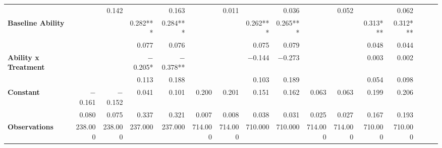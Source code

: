 \begin{tabular}{@{\extracolsep{5pt}}lrrrrrrrrrrrrrrr}
{\bf } & \phantom{***} & 0.142\phantom{\phantom{)}***} & \phantom{***} & 0.163\phantom{\phantom{)}***} & \phantom{***} & 0.011\phantom{\phantom{)}***} & \phantom{***} & 0.036\phantom{\phantom{)}***} & \phantom{***} & 0.052\phantom{\phantom{)}***} & \phantom{***} & 0.062\phantom{\phantom{)}***} \\
{\bf Baseline Ability} & \phantom{***} & \phantom{***} & 0.282\phantom{)}*** & 0.284\phantom{)}*** & \phantom{***} & \phantom{***} & 0.262\phantom{)}*** & 0.265\phantom{)}*** & \phantom{***} & \phantom{***} & 0.313\phantom{)}*** & 0.312\phantom{)}*** \\
{\bf } & \phantom{***} & \phantom{***} & 0.077\phantom{\phantom{)}***} & 0.076\phantom{\phantom{)}***} & \phantom{***} & \phantom{***} & 0.075\phantom{\phantom{)}***} & 0.079\phantom{\phantom{)}***} & \phantom{***} & \phantom{***} & 0.048\phantom{\phantom{)}***} & 0.044\phantom{\phantom{)}***} \\
{\bf Ability x Treatment} & \phantom{***} & \phantom{***} & $-$0.205\phantom{)}*\phantom{**} & $-$0.378\phantom{)}**\phantom{*} & \phantom{***} & \phantom{***} & $-$0.144\phantom{\phantom{)}***} & $-$0.273\phantom{\phantom{)}***} & \phantom{***} & \phantom{***} & 0.003\phantom{\phantom{)}***} & 0.002\phantom{\phantom{)}***} \\
{\bf } & \phantom{***} & \phantom{***} & 0.113\phantom{\phantom{)}***} & 0.188\phantom{\phantom{)}***} & \phantom{***} & \phantom{***} & 0.103\phantom{\phantom{)}***} & 0.189\phantom{\phantom{)}***} & \phantom{***} & \phantom{***} & 0.054\phantom{\phantom{)}***} & 0.098\phantom{\phantom{)}***} \\
{\bf Constant} & $-$0.161\phantom{\phantom{)}***} & $-$0.152\phantom{\phantom{)}***} & 0.041\phantom{\phantom{)}***} & 0.101\phantom{\phantom{)}***} & 0.200\phantom{\phantom{)}***} & 0.201\phantom{\phantom{)}***} & 0.151\phantom{\phantom{)}***} & 0.162\phantom{\phantom{)}***} & 0.063\phantom{\phantom{)}***} & 0.063\phantom{\phantom{)}***} & 0.199\phantom{\phantom{)}***} & 0.206\phantom{\phantom{)}***} \\
{\bf } & 0.080\phantom{\phantom{)}***} & 0.075\phantom{\phantom{)}***} & 0.337\phantom{\phantom{)}***} & 0.321\phantom{\phantom{)}***} & 0.007\phantom{\phantom{)}***} & 0.008\phantom{\phantom{)}***} & 0.038\phantom{\phantom{)}***} & 0.031\phantom{\phantom{)}***} & 0.025\phantom{\phantom{)}***} & 0.027\phantom{\phantom{)}***} & 0.167\phantom{\phantom{)}***} & 0.193\phantom{\phantom{)}***} \\
{\bf Observations} & 238.000\phantom{\phantom{)}***} & 238.000\phantom{\phantom{)}***} & 237.000\phantom{\phantom{)}***} & 237.000\phantom{\phantom{)}***} & 714.000\phantom{\phantom{)}***} & 714.000\phantom{\phantom{)}***} & 710.000\phantom{\phantom{)}***} & 710.000\phantom{\phantom{)}***} & 714.000\phantom{\phantom{)}***} & 714.000\phantom{\phantom{)}***} & 710.000\phantom{\phantom{)}***} & 710.000\phantom{\phantom{)}***} \\

\end{tabular}
